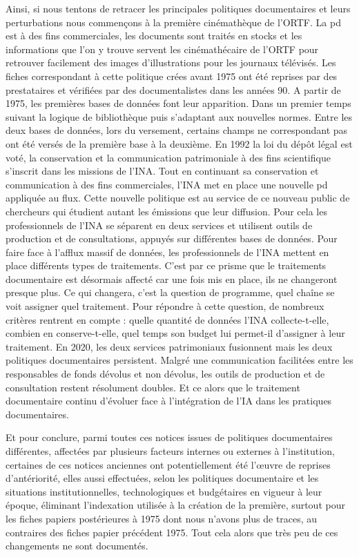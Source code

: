 Ainsi, si nous tentons de retracer les principales politiques documentaires et leurs perturbations nous commençons à la première cinémathèque de l'ORTF. La \gls{pd} est à des fins commerciales, les documents sont traités en stocks et les informations que l'on y trouve servent les cinémathécaire de l'ORTF pour retrouver facilement des images d'illustrations pour les journaux télévisés. Les fiches correspondant à cette politique crées avant 1975 ont été reprises par des prestataires et vérifiées par des documentalistes dans les années 90. A partir de 1975, les premières bases de données font leur apparition. Dans un premier temps suivant la logique de bibliothèque puis s'adaptant aux nouvelles normes. Entre les deux bases de données, lors du versement, certains champs ne correspondant pas ont été versés de la première base à la deuxième. En 1992 la loi du dépôt légal est voté, la conservation et la communication patrimoniale à des fins scientifique s'inscrit dans les missions de l'INA. Tout en continuant sa conservation et communication à des fins commerciales, l'INA met en place une nouvelle \gls{pd} appliquée au flux. Cette nouvelle politique est au service de ce nouveau public de chercheurs qui étudient autant les émissions que leur diffusion. Pour cela les professionnels de l'INA se séparent en deux services et utilisent outils de production et de consultations, appuyés sur différentes bases de données. Pour faire face à l’afflux massif de données, les professionnels de l'INA mettent en place différents types de traitements. C'est par ce prisme que le traitements documentaire est désormais affecté car une fois mis en place, ils ne changeront presque plus. Ce qui changera, c'est la question de programme, quel chaîne se voit assigner quel traitement. Pour répondre à cette question, de nombreux critères rentrent en compte : quelle quantité de données l'INA collecte-t-elle, combien en conserve-t-elle, quel temps son budget lui permet-il d'assigner à leur traitement. En 2020, les deux services patrimoniaux fusionnent mais les deux politiques documentaires persistent. Malgré une communication facilitées entre les responsables de fonds dévolus et non dévolus, les outils de production et de consultation restent résolument doubles. Et ce alors que le traitement documentaire continu d'évoluer face à l'intégration de l'IA dans les pratiques documentaires. 


Et pour conclure, parmi toutes ces notices issues de politiques documentaires différentes, affectées par plusieurs facteurs internes ou externes à l'institution, certaines de ces notices anciennes ont potentiellement été l’œuvre de reprises d'antériorité, elles aussi effectuées, selon les politiques documentaire et les situations institutionnelles, technologiques et budgétaires en vigueur à leur époque, éliminant l'indexation utilisée à la création de la première, surtout pour les fiches papiers postérieures à 1975 dont nous n'avons plus de traces, au contraires des fiches papier précédent 1975. Tout cela alors que très peu de ces changements ne sont documentés. 

